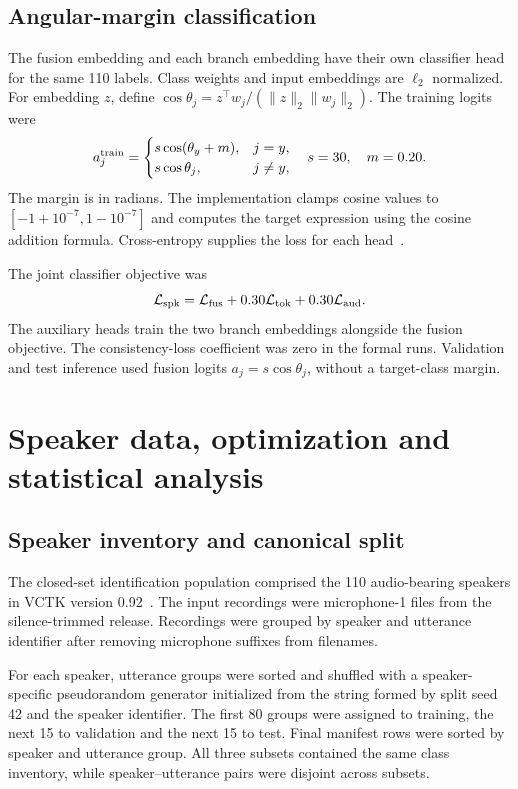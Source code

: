 \subsection{Angular-margin classification}
The fusion embedding and each branch embedding have their own classifier head for the same 110 labels. Class weights and input embeddings are $\ell_2$ normalized. For embedding $z$, define $\cos\theta_j=z^\top w_j/(\|z\|_2\|w_j\|_2)$. The training logits were
\begin{equation}
 a_j^{\rm train}=
 \begin{cases}
 s\cos(\theta_y+m), & j=y,\\
 s\cos\theta_j, & j\ne y,
 \end{cases}
 \quad s=30,\quad m=0.20.
 \label{eq:sv2-aam}
\end{equation}
The margin is in radians. The implementation clamps cosine values to $[-1+10^{-7},1-10^{-7}]$ and computes the target expression using the cosine addition formula. Cross-entropy supplies the loss for each head~\cite{arcface}.

The joint classifier objective was
\begin{equation}
 \mathcal L_{\rm spk}
 =\mathcal L_{\rm fus}
  +0.30\mathcal L_{\rm tok}
  +0.30\mathcal L_{\rm aud}.
 \label{eq:sv2-spkloss}
\end{equation}
The auxiliary heads train the two branch embeddings alongside the fusion objective. The consistency-loss coefficient was zero in the formal runs. Validation and test inference used fusion logits $a_j=s\cos\theta_j$, without a target-class margin.

\section{Speaker data, optimization and statistical analysis}
\label{sec:sv2-speaker-protocol}

\subsection{Speaker inventory and canonical split}
The closed-set identification population comprised the 110 audio-bearing speakers in VCTK version 0.92~\cite{vctk}. The input recordings were microphone-1 files from the silence-trimmed release. Recordings were grouped by speaker and utterance identifier after removing microphone suffixes from filenames.

For each speaker, utterance groups were sorted and shuffled with a speaker-specific pseudorandom generator initialized from the string formed by split seed 42 and the speaker identifier. The first 80 groups were assigned to training, the next 15 to validation and the next 15 to test. Final manifest rows were sorted by speaker and utterance group. All three subsets contained the same class inventory, while speaker--utterance pairs were disjoint across subsets.

